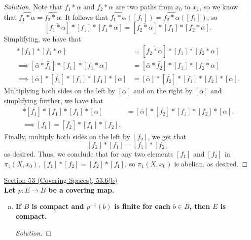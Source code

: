 \documentclass[11pt]{article}
\newenvironment{solution}
  {\renewcommand\qedsymbol{$\blacksquare$}\begin{proof}[Solution]}
  {\end{proof}}
\begin{document}
\begin{solution}
Note that $f_1 * \alpha$ and $f_2 * \alpha$ are two paths from $x_0$ to $x_1$, so we know that $\widehat{f_1 * \alpha} = \widehat{f_2 * \alpha}$. It follows that
$\widehat{f_1 * \alpha}([f_1]) = \widehat{f_2 * \alpha}([f_1])$, so
\[
    [\overline{f_1 * \alpha}] * [f_1] * [f_1 * \alpha] = [\overline{f_2 * \alpha}] * [f_1] * [f_2 * \alpha].
\]
Simplifying, we have that
\begin{align*}
    [\overline{f_1 * \alpha}] * [f_1] * [f_1 * \alpha] &= [\overline{f_2 * \alpha}] * [f_1] * [f_2 * \alpha] \\
    \implies [\bar{\alpha} * \bar{f_1}] * [f_1] * [f_1 * \alpha] &= [\bar{\alpha} * \bar{f_2}] * [f_1] * [f_2 * \alpha] \\
    \implies [\bar{\alpha}] * [\bar{f_1}] * [f_1] * [f_1] * [\alpha] &= [\bar{\alpha}] * [\bar{f_2}] * [f_1] * [f_2] * [\alpha].
\end{align*}
Multiplying both sides on the left by $[\alpha]$ and on the right by $[\bar{\alpha}]$ and simplifying further, we have that
\begin{align*}
    [\bar{\alpha}] * [\bar{f_1}] * [f_1] * [f_1] * [\alpha] &= [\bar{\alpha}] * [\bar{f_2}] * [f_1] * [f_2] * [\alpha]. \\
    \implies [f_1] = [\bar{f_2}] * [f_1] * [f_2].
\end{align*}
Finally, multiply both sides on the left by $[f_2]$, we get that 
\[
    [f_2] * [f_1] = [f_1] * [f_2]
\]
as desired. Thus, we conclude that for any two elements $[f_1]$ and $[f_2]$ in $\pi_1(X, x_0)$, $[f_1] * [f_2] = [f_2] * [f_1]$, so $\pi_1(X, x_0)$ is abelian, as desired.
\end{solution}

\newpage

\underline{Section 53 (Covering Spaces), 53.6(b)} \\

\textbf{Let $p\colon E \rightarrow B$ be a covering map.}

\begin{enumerate}[b)]
    \item \textbf{If $B$ is compact and $p^{-1}(b)$ is finite for each $b \in B$, then $E$ is compact.}
    
    \begin{solution}
        
    \end{solution}
\end{enumerate}

\newpage
\end{document}
